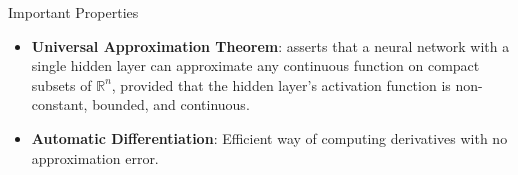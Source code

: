


\begin{frame}{Important Properties}

    \begin{itemize}
        \item \textbf{Universal Approximation Theorem}: asserts that a neural network with a single hidden layer can approximate any continuous function on compact subsets of $\mathbb{R}^n$, provided that the hidden layer's activation function is non-constant, bounded, and continuous.
        \item \textbf{Automatic Differentiation}: Efficient way of computing derivatives with no approximation error.
    \end{itemize}
    
\end{frame}
